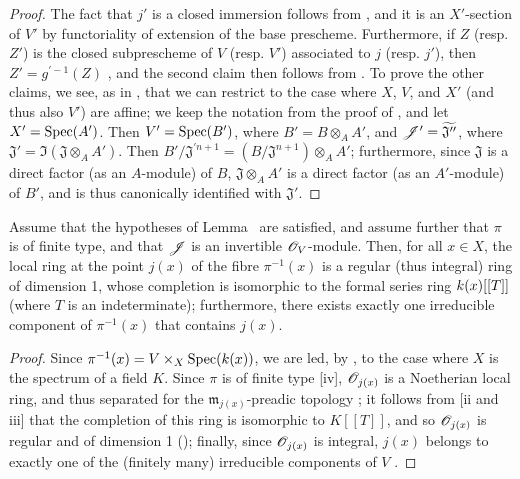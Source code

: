 \begin{proof}
The fact that $j'$ is a closed immersion follows from , and it is an $X'$-section of $V'$ by functoriality of extension of the base prescheme.
Furthermore, if $Z$ (resp. $Z'$) is the closed subprescheme of $V$ (resp. $V'$) associated to $j$ (resp. $j'$), then $Z'=g^{'-1}(Z)$ , and the second claim then follows from .
To prove the other claims, we see, as in , that we can restrict to the case where $X$, $V$, and $X'$ (and thus also $V'$) are affine;
we keep the notation from the proof of , and let $X'=\operatorname{Spec}(A')$.
Then $V'=\operatorname{Spec}(B')$, where $B'=B\otimes_A A'$, and $\mathscr{J}'=\widetilde{\mathfrak{J}''}$, where $\mathfrak{J}'=\Im(\mathfrak{J}\otimes_A A')$.
Then $B'/\mathfrak{J}^{'n+1}=(B/\mathfrak{J}^{n+1})\otimes_A A'$;
furthermore, since $\mathfrak{J}$ is a direct factor (as an $A$-module) of $B$, $\mathfrak{J}\otimes_A A'$ is a direct factor (as an $A'$-module) of $B'$, and is thus canonically identified with $\mathfrak{J}'$.
\end{proof}

\begin{corollary}[8.10.3]
\label{II.8.10.3}
Assume that the hypotheses of Lemma~ are satisfied, and assume further that $\pi$ is of finite type, and that $\mathscr{J}$ is an invertible $\mathscr{O}_V$-module.
Then, for all $x\in X$, the local ring at the point $j(x)$ of the fibre $\pi^{-1}(x)$ is a regular (thus integral) ring of dimension 1, whose completion is isomorphic to the formal series ring $k(x)[[T]]$ (where $T$ is an indeterminate);
furthermore, there exists exactly one irreducible component of $\pi^{-1}(x)$ that contains $j(x)$.
\end{corollary}

\begin{proof}
Since $\pi^{-1}(x)=V\times_X\operatorname{Spec}(k(x))$, we are led, by , to the case where $X$ is the spectrum of a field $K$.
Since $\pi$ is of finite type [iv], $\mathscr{O}_{j(x)}$ is a Noetherian local ring, and thus separated for the $\mathfrak{m}_{j(x)}$-preadic topology ;
it follows from [ii and iii] that the completion of this ring is isomorphic to $K[[T]]$, and so $\mathscr{O}_{j(x)}$ is regular and of dimension 1 (\cite[p.~17-01, th.~1]{I-1});
finally, since $\mathscr{O}_{j(x)}$ is integral, $j(x)$ belongs to exactly one of the (finitely many) irreducible components of $V$ .
\end{proof}

